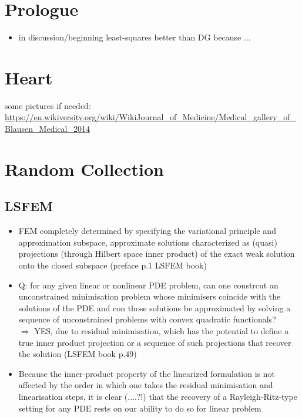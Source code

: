 \documentclass[a4paper, 11pt]{report}
\begin{document}
\chapter{Prologue}	

\begin{itemize}
\item in discussion/beginning least-squares better than DG because ...
\end{itemize}

\chapter{Heart}
some pictures if needed: 
\url{https://en.wikiversity.org/wiki/WikiJournal_of_Medicine/Medical_gallery_of_Blausen_Medical_2014}

\chapter{Random Collection}

\section{LSFEM}
\begin{itemize}
	\item FEM completely determined by specifying the variational principle and approximation subspace, approximate solutions characterized as (quasi) projections (through Hilbert space inner product) of the exact weak solution onto the closed subspace (preface p.1 LSFEM book) \\
	\item Q: for any given linear or nonlinear PDE problem, can one constrcut an unconstrained minimisation problem whose minimisers coincide with the solutions of the PDE and con those solutions be approximated by solving a sequence of unconstrained problems with convex quadratic functionals? \\
	$\Rightarrow$ YES, due to residual minimisation, which has the potential to define a true inner product projection or a sequence of such projections that recover the solution (LSFEM book p.49)
	\item Because the inner-product property of the linearized formulation is not affected by the order in which one takes the residual minimisation and linearisation steps, it is clear (....?!) that the recovery of a Rayleigh-Ritz-type setting for any PDE rests on our ability to do so for linear problem 

	 
\end{itemize}
	
\end{document}
